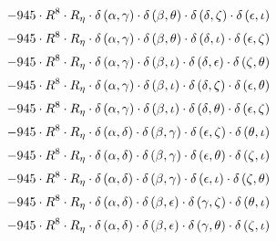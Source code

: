 \begin{subequations}
\begin{gather}
 \\[0.2em] \notag 		 - 945 \cdot R^{8} \cdot R_{\eta{}} \cdot \delta{}\left(\alpha{}, \gamma{}\right) \cdot \delta{}\left(\beta{}, \theta{}\right) \cdot \delta{}\left(\delta{}, \zeta{}\right) \cdot \delta{}\left(\epsilon{}, \iota{}\right) 
 \\[0.2em] \notag 		 - 945 \cdot R^{8} \cdot R_{\eta{}} \cdot \delta{}\left(\alpha{}, \gamma{}\right) \cdot \delta{}\left(\beta{}, \theta{}\right) \cdot \delta{}\left(\delta{}, \iota{}\right) \cdot \delta{}\left(\epsilon{}, \zeta{}\right) 
 \\[0.2em] \notag 		 - 945 \cdot R^{8} \cdot R_{\eta{}} \cdot \delta{}\left(\alpha{}, \gamma{}\right) \cdot \delta{}\left(\beta{}, \iota{}\right) \cdot \delta{}\left(\delta{}, \epsilon{}\right) \cdot \delta{}\left(\zeta{}, \theta{}\right) 
 \\[0.2em] \notag 		 - 945 \cdot R^{8} \cdot R_{\eta{}} \cdot \delta{}\left(\alpha{}, \gamma{}\right) \cdot \delta{}\left(\beta{}, \iota{}\right) \cdot \delta{}\left(\delta{}, \zeta{}\right) \cdot \delta{}\left(\epsilon{}, \theta{}\right) 
 \\[0.2em] \notag 		 - 945 \cdot R^{8} \cdot R_{\eta{}} \cdot \delta{}\left(\alpha{}, \gamma{}\right) \cdot \delta{}\left(\beta{}, \iota{}\right) \cdot \delta{}\left(\delta{}, \theta{}\right) \cdot \delta{}\left(\epsilon{}, \zeta{}\right) 
 \\[0.2em] \notag 		 - 945 \cdot R^{8} \cdot R_{\eta{}} \cdot \delta{}\left(\alpha{}, \delta{}\right) \cdot \delta{}\left(\beta{}, \gamma{}\right) \cdot \delta{}\left(\epsilon{}, \zeta{}\right) \cdot \delta{}\left(\theta{}, \iota{}\right) 
 \\[0.2em] \notag 		 - 945 \cdot R^{8} \cdot R_{\eta{}} \cdot \delta{}\left(\alpha{}, \delta{}\right) \cdot \delta{}\left(\beta{}, \gamma{}\right) \cdot \delta{}\left(\epsilon{}, \theta{}\right) \cdot \delta{}\left(\zeta{}, \iota{}\right) 
 \\[0.2em] \notag 		 - 945 \cdot R^{8} \cdot R_{\eta{}} \cdot \delta{}\left(\alpha{}, \delta{}\right) \cdot \delta{}\left(\beta{}, \gamma{}\right) \cdot \delta{}\left(\epsilon{}, \iota{}\right) \cdot \delta{}\left(\zeta{}, \theta{}\right) 
 \\[0.2em] \notag 		 - 945 \cdot R^{8} \cdot R_{\eta{}} \cdot \delta{}\left(\alpha{}, \delta{}\right) \cdot \delta{}\left(\beta{}, \epsilon{}\right) \cdot \delta{}\left(\gamma{}, \zeta{}\right) \cdot \delta{}\left(\theta{}, \iota{}\right) 
 \\[0.2em] \notag 		 - 945 \cdot R^{8} \cdot R_{\eta{}} \cdot \delta{}\left(\alpha{}, \delta{}\right) \cdot \delta{}\left(\beta{}, \epsilon{}\right) \cdot \delta{}\left(\gamma{}, \theta{}\right) \cdot \delta{}\left(\zeta{}, \iota{}\right) 

\end{gather}
\end{subequations}
